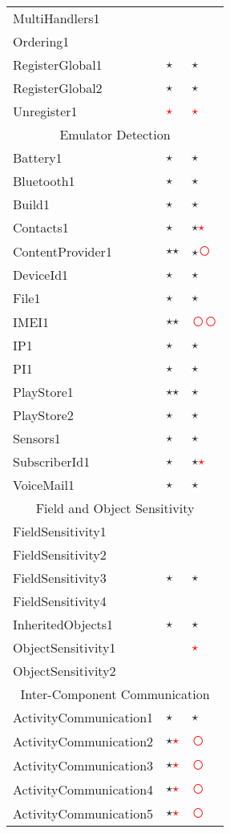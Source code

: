 \documentclass[../draft.tex]{subfiles}
\newcommand{\fp}{\textcolor{white}{\textcircled{\textcolor{red}{$\star$}}}}
\newcommand{\fn}{\textcolor{red}{\textcircled{ }}}
\newcommand{\tp}[0]{\textcircled{$\star$}}
\newcommand{\tsub}[1]{\multicolumn{3}{c}{#1}\\\hline}
\begin{document}
\begin{longtable}{l | l | l}
        MultiHandlers1 & & \\
        Ordering1 & & \\
        RegisterGlobal1 & \tp & \tp\\
        RegisterGlobal2 & \tp & \tp\\
        Unregister1 & \fp & \fp\\
        \hline
        \tsub{Emulator Detection}
        Battery1 & \tp & \tp\\
        Bluetooth1 & \tp & \tp\\
        Build1 & \tp & \tp\\
        Contacts1 & \tp & \tp \fp\\
        ContentProvider1 & \tp \tp & \tp \fn\\
        DeviceId1 & \tp & \tp\\
        File1 & \tp & \tp\\
        IMEI1 & \tp \tp & \fn \fn\\
        IP1 & \tp & \tp\\
        PI1 & \tp & \tp\\
        PlayStore1 & \tp \tp & \tp\\
        PlayStore2 & \tp & \tp\\
        Sensors1 & \tp & \tp\\
        SubscriberId1 & \tp & \tp \fp\\
        VoiceMail1 & \tp & \tp\\
        \hline
        \tsub{Field and Object Sensitivity}
        FieldSensitivity1 & & \\
        FieldSensitivity2 & & \\
        FieldSensitivity3 & \tp & \tp\\
        FieldSensitivity4 & & \\
        InheritedObjects1 & \tp & \tp\\
        ObjectSensitivity1 & & \fp\\
        ObjectSensitivity2 & & \\
        \hline
        \tsub{Inter-Component Communication}
        ActivityCommunication1 & \tp & \tp\\
        ActivityCommunication2 & \tp \fp & \fn\\
        ActivityCommunication3 & \tp \fp & \fn\\
        ActivityCommunication4 & \tp \fp & \fn\\
        ActivityCommunication5 & \tp \fp & \fn\\

\end{longtable}
\end{document}
